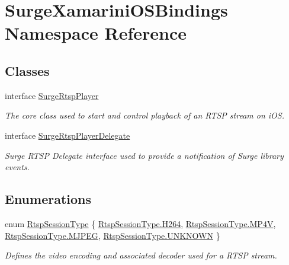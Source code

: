 \hypertarget{namespace_surge_xamarini_o_s_bindings}{}\section{Surge\+Xamarini\+O\+S\+Bindings Namespace Reference}
\label{namespace_surge_xamarini_o_s_bindings}
\subsection*{Classes}
\begin{DoxyCompactItemize}
\item 
interface \hyperlink{interface_surge_xamarini_o_s_bindings_1_1_surge_rtsp_player}{Surge\+Rtsp\+Player}
\begin{DoxyCompactList}\small\item\em The core class used to start and control playback of an R\+T\+SP stream on i\+OS. \end{DoxyCompactList}\item 
interface \hyperlink{interface_surge_xamarini_o_s_bindings_1_1_surge_rtsp_player_delegate}{Surge\+Rtsp\+Player\+Delegate}
\begin{DoxyCompactList}\small\item\em Surge R\+T\+SP Delegate interface used to provide a notification of Surge library events. \end{DoxyCompactList}\end{DoxyCompactItemize}
\subsection*{Enumerations}
\begin{DoxyCompactItemize}
\item 
enum \hyperlink{namespace_surge_xamarini_o_s_bindings_ae265f95a36d7f788d0c279a0cd2da6c1}{Rtsp\+Session\+Type} \{ \hyperlink{namespace_surge_xamarini_o_s_bindings_ae265f95a36d7f788d0c279a0cd2da6c1a8ba63b54352f7053b055235a9ec7ac09}{Rtsp\+Session\+Type.\+H264}, 
\hyperlink{namespace_surge_xamarini_o_s_bindings_ae265f95a36d7f788d0c279a0cd2da6c1af179a0ff369a82a40dfdc8426e289bd2}{Rtsp\+Session\+Type.\+M\+P4V}, 
\hyperlink{namespace_surge_xamarini_o_s_bindings_ae265f95a36d7f788d0c279a0cd2da6c1a0a5417ce14732e9bdb402be642ebe9ea}{Rtsp\+Session\+Type.\+M\+J\+P\+EG}, 
\hyperlink{namespace_surge_xamarini_o_s_bindings_ae265f95a36d7f788d0c279a0cd2da6c1a696b031073e74bf2cb98e5ef201d4aa3}{Rtsp\+Session\+Type.\+U\+N\+K\+N\+O\+WN}
 \}\begin{DoxyCompactList}\small\item\em Defines the video encoding and associated decoder used for a R\+T\+SP stream. \end{DoxyCompactList}
\end{DoxyCompactItemize}


